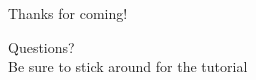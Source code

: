 \hidenum
\begin{frame}[noframenumbering]
 \begin{block}{Thanks for coming!}
 \begin{center}
     {\Large Questions?}\\[.6cm]
     Be sure to stick around for the tutorial
  \end{center}
 \end{block}
\end{frame}
